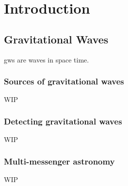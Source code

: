 \chapter{Introduction}
\label{chap:intro}
\chaptoc{}


\newpage
\section{Gravitational Waves}
\label{sec:gw}
\begin{colsection}


\begin{colsection}

\glspl{gw} are waves in space time.

\end{colsection}

\subsection{Sources of gravitational waves}
\label{sec:gw_sources}
\begin{colsection}

WIP

\end{colsection}

\subsection{Detecting gravitational waves}
\label{sec:gw_detecting}
\begin{colsection}

WIP

\end{colsection}

\subsection{Multi-messenger astronomy}
\label{sec:multimessenger}
\begin{colsection}

WIP

\end{colsection}


\end{colsection}

